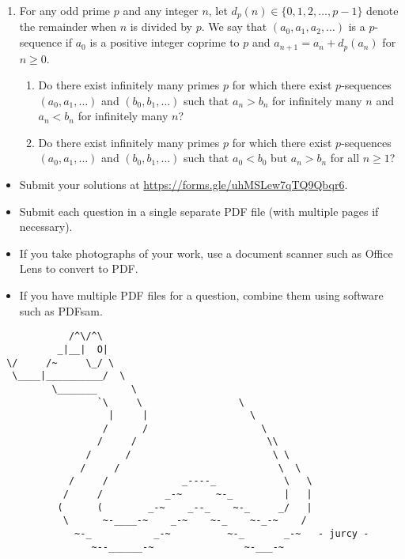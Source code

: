 \documentclass{article}
\begin{document}
\begin{enumerate}[leftmargin=0pt, itemsep=12pt]
\item %
For any odd prime $p$ and any integer $n$, let $d_p(n) \in \{0, 1, 2, \dotsc, p-1\}$ denote the remainder when $n$ is divided by $p$.
We say that $(a_0, a_1, a_2, \dotsc)$ is a $p$-sequence if $a_0$ is a positive integer coprime to $p$ and $a_{n+1} = a_n +d_p(a_n)$ for $n \geq 0$.
\begin{enumerate}[label=(\alph*)]
  \item Do there exist infinitely many primes $p$ for which there exist $p$-sequences $(a_0, a_1, \dotsc)$ and $(b_0, b_1, \dotsc)$ such that $a_n > b_n$ for infinitely many $n$ and $a_n < b_n$ for infinitely many $n$?
  \item Do there exist infinitely many primes $p$ for which there exist $p$-sequences $(a_0, a_1, \dotsc)$ and $(b_0, b_1, \dotsc)$ such that $a_0 < b_0$ but $a_n > b_n$ for all $n \geq 1$?
\end{enumerate}

\end{enumerate}


\vfill
\vfill
\begin{itemize}
	\item Submit your solutions at \url{https://forms.gle/uhMSLew7qTQ9Qbqr6}.
	\item Submit each question in a single separate PDF file (with multiple pages if necessary).
	\item If you take photographs of your work, use a document scanner such as Office Lens to convert to PDF.
	\item If you have multiple PDF files for a question, combine them using software such as PDFsam.
\end{itemize}

\vfill
\centering
\tiny
\begin{BVerbatim}
            /^\/^\
          _|__|  O|
 \/     /~     \_/ \
  \____|__________/  \
         \_______      \
                 `\     \                 \
                   |     |                  \
                  /      /                    \
                 /     /                       \\
               /      /                         \ \
              /     /                            \  \
            /     /             _----_            \   \
           /     /           _-~      ~-_         |   |
          (      (        _-~    _--_    ~-_     _/   |
           \      ~-____-~    _-~    ~-_    ~-_-~    /
             ~-_           _-~          ~-_       _-~   - jurcy -
                ~--______-~                ~-___-~
\end{BVerbatim}
\end{document}
